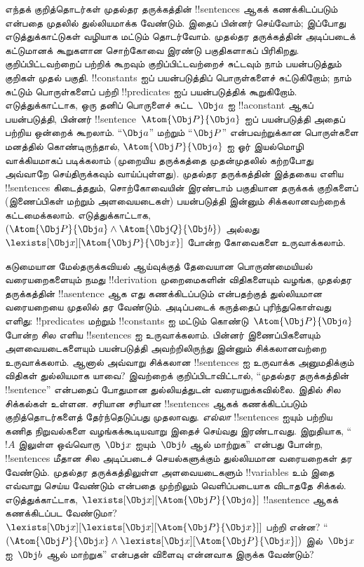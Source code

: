 \documentclass[../../../include/open-logic-section]{subfiles}
\begin{document}


எந்தக் குறித்தொடர்கள் முதல்தர தருக்கத்தின் !!{sentence}s ஆகக் கணக்கிடப்படும்
என்பதை முதலில் துல்லியமாக்க வேண்டும். இதைப் பின்னர் செய்வோம்; இப்போது
எடுத்துக்காட்டுகள் வழியாக மட்டும் தொடர்வோம். முதல்தர தருக்கத்தின் அடிப்படைக்
கட்டுமானக் கூறுகளான சொற்கோவை இரண்டு பகுதிகளாகப் பிரிகிறது. குறிப்பிட்டவற்றைப்
பற்றிக் கூறவும் குறிப்பிட்டவற்றைச் சுட்டவும் நாம் பயன்படுத்தும் குறிகள் முதல்
பகுதி. !!{constant}s ஐப் பயன்படுத்திப் பொருள்களைச் சுட்டுகிறோம்; நாம் சுட்டும்
பொருள்களைப் பற்றி !!{predicate}s ஐப் பயன்படுத்திக் கூறுகிறோம். எடுத்துக்காட்டாக,
ஒரு தனிப் பொருளைச் சுட்ட~$\Obj a$ ஐ !!a{constant} ஆகப் பயன்படுத்தி, பின்னர்
!!{sentence}~$\Atom{\Obj P}{\Obj a}$ ஐப் பயன்படுத்தி அதைப் பற்றிய ஒன்றைக்
கூறலாம். ``$\Obj a$'' மற்றும் ``$\Obj P$'' என்பவற்றுக்கான பொருள்களை மனத்தில்
கொண்டிருந்தால், $\Atom{\Obj P}{\Obj a}$ ஐ ஓர் இயல்மொழி வாக்கியமாகப்
படிக்கலாம் (முறையிய தருக்கத்தை முதன்முதலில் கற்றபோது அவ்வாறே செய்திருக்கவும்
வாய்ப்புள்ளது). முதல்தர தருக்கத்தின் இத்தகைய எளிய !!{sentence}s கிடைத்ததும்,
சொற்கோவையின் இரண்டாம் பகுதியான தருக்கக் குறிகளைப் (இணைப்பிகள் மற்றும்
அளவையடைகள்) பயன்படுத்தி இன்னும் சிக்கலானவற்றைக் கட்டமைக்கலாம். எடுத்துக்காட்டாக,
$(\Atom{\Obj P}{\Obj a} \land \Atom{\Obj Q}{\Obj b})$ அல்லது
$\lexists[\Obj x][\Atom{\Obj P}{\Obj x}]$ போன்ற கோவைகளை உருவாக்கலாம்.

கடுமையான மேல்தருக்கவியல் ஆய்வுக்குத் தேவையான பொருண்மையியல் வரையறைகளையும்
நமது !!{derivation} முறைமைகளின் விதிகளையும் வழங்க, முதல்தர தருக்கத்தின்
!!a{sentence} ஆக எது கணக்கிடப்படும் என்பதற்குத் துல்லியமான வரையறையை முதலில்
தர வேண்டும். அடிப்படைக் கருத்தைப் புரிந்துகொள்வது எளிது: !!{predicate}s மற்றும்
!!{constant}s ஐ மட்டும் கொண்டு~$\Atom{\Obj P}{\Obj a}$ போன்ற சில எளிய
!!{sentence}s ஐ உருவாக்கலாம். பின்னர் இணைப்பிகளையும் அளவையடைகளையும்
பயன்படுத்தி அவற்றிலிருந்து இன்னும் சிக்கலானவற்றை உருவாக்கலாம். ஆனால் அவ்வாறு
சிக்கலான !!{sentence}s ஐ உருவாக்க அனுமதிக்கும் விதிகள் துல்லியமாக யாவை?
இவற்றைக் குறிப்பிடாவிட்டால், ``முதல்தர தருக்கத்தின் !!{sentence}'' என்பதைப்
போதுமான துல்லியத்துடன் வரையறுக்கவில்லை. இதில் சில சிக்கல்கள் உள்ளன. சரியான
சரியான !!{sentence}s ஆகக் கணக்கிடப்படும் குறித்தொடர்களைத் தேர்ந்தெடுப்பது
முதலாவது. \emph{எல்லா}
!!{sentence}s ஐயும் பற்றிய கணித நிறுவல்களை வழங்கக்கூடியவாறு இதைச் செய்வது
இரண்டாவது. இறுதியாக, ``$!A$ இலுள்ள ஒவ்வொரு~$\Obj x$ ஐயும்~$\Obj b$ ஆல்
மாற்றுக'' என்பது போன்ற, !!{sentence}s மீதான சில அடிப்படைச் செயல்களுக்கும்
துல்லியமான வரையறைகள் தர வேண்டும். முதல்தர தருக்கத்திலுள்ள அளவையடைகளும்
!!{variable}s உம் இதை எவ்வாறு செய்ய வேண்டும் என்பதை முற்றிலும் வெளிப்படையாக
விடாததே சிக்கல். எடுத்துக்காட்டாக, $\lexists[\Obj x][\Atom{\Obj P}{\Obj a}]$
!!a{sentence} ஆகக் கணக்கிடப்பட வேண்டுமா? $\lexists[\Obj x][\lexists[\Obj
x][\Atom{\Obj P}{\Obj x}]]$ பற்றி என்ன? ``$(\Atom{\Obj P}{\Obj x} \land
\lexists[\Obj x][\Atom{\Obj P}{\Obj x}])$ இல்~$\Obj x$ ஐ~$\Obj b$ ஆல்
மாற்றுக'' என்பதன் விளைவு என்னவாக இருக்க வேண்டும்?
\end{document}
